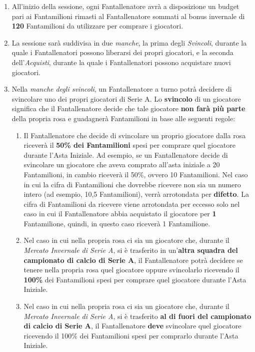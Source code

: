 \documentclass[12pt]{article}
\begin{document}
\begin{enumerate}
    \item All’inizio della sessione, ogni Fantallenatore avrà a disposizione un budget pari ai Fantamilioni rimasti al Fantallenatore sommati al bonus invernale di \textbf{120} Fantamilioni da utilizzare per comprare i giocatori.
    \item La sessione sarà suddivisa in due \textit{manche}, la prima degli \textit{Svincoli}, durante la quale i Fantallenatori possono liberarsi dei propri giocatori, e la seconda dell'\textit{Acquisti}, durante la quale i Fantallenatori possono acquistare nuovi giocatori.
    \item Nella \textit{manche degli svincoli}, un Fantallenatore a turno potrà decidere di svincolare uno dei propri giocatori di Serie A. Lo \textbf{svincolo} di un giocatore significa che il Fantallenatore decide che tale giocatore \textbf{non farà più parte} della propria rosa e guadagnerà Fantamilioni in base alle seguenti regole:
    \begin{enumerate}
        \item Il Fantallenatore che decide di svincolare un proprio giocatore dalla rosa riceverà il \textbf{50\% dei Fantamilioni} spesi per comprare quel giocatore durante l’Asta Iniziale. Ad esempio, se un Fantallenatore decide di svincolare un giocatore che aveva comprato all’asta iniziale a 20 Fantamilioni, in cambio riceverà il 50\%, ovvero 10 Fantamilioni. Nel caso in cui la cifra di Fantamilioni che dovrebbe ricevere non sia un numero intero (ad esempio, 10,5 Fantamilioni), verrà arrotondata per \textbf{difetto}. La cifra di Fantamilioni da ricevere viene arrotondata per eccesso solo nel caso in cui il Fantallenatore abbia acquistato il giocatore per \textbf{1} Fantamilione, quindi, in questo caso riceverà 1 Fantamilione. 
        \item Nel caso in cui nella propria rosa ci sia un giocatore che, durante il \textit{Mercato Invernale di Serie A}, si è trasferito in un’\textbf{altra squadra del campionato di calcio di Serie A}, il Fantallenatore potrà decidere se tenere nella propria rosa quel giocatore oppure svincolarlo ricevendo il \textbf{100\%} dei Fantamilioni spesi per comprare quel giocatore durante l’Asta Iniziale.
        \item Nel caso in cui nella propria rosa ci sia un giocatore che, durante il \textit{Mercato Invernale di Serie A}, si è trasferito \textbf{al di fuori del campionato di calcio di Serie A}, il Fantallenatore \textbf{deve} svincolare quel giocatore ricevendo il 100\% dei Fantamilioni spesi per comprarlo durante l’Asta Iniziale.

\end{enumerate}
\end{enumerate}
\end{document}
